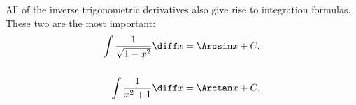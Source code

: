 \begin{frame}
All of the inverse trigonometric derivatives also give rise to integration formulas.  These two are the most important:
\begin{align*}
\int \frac{1}{\sqrt{1-x^2}}\diff x & = \Arcsin x + C.\\
& \\
\int \frac{1}{x^2 + 1}\diff x & = \Arctan x + C.
\end{align*}
\end{frame}
